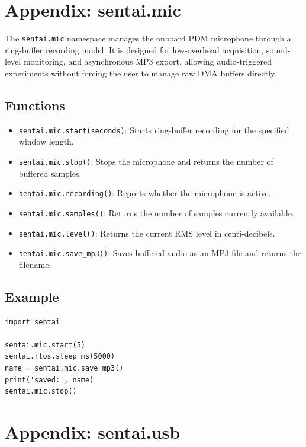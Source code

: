 \section{Appendix: sentai.mic}\label{appendix-sentai.mic}

The \texttt{sentai.mic} namespace manages the onboard PDM microphone
through a ring-buffer recording model. It is designed for low-overhead
acquisition, sound-level monitoring, and asynchronous MP3 export,
allowing audio-triggered experiments without forcing the user to manage
raw DMA buffers directly.

\subsection{Functions}\label{functions-7}

\begin{itemize}
\tightlist
\item
  \texttt{sentai.mic.start(seconds)}: Starts ring-buffer recording for
  the specified window length.
\item
  \texttt{sentai.mic.stop()}: Stops the microphone and returns the
  number of buffered samples.
\item
  \texttt{sentai.mic.recording()}: Reports whether the microphone is
  active.
\item
  \texttt{sentai.mic.samples()}: Returns the number of samples currently
  available.
\item
  \texttt{sentai.mic.level()}: Returns the current RMS level in
  centi-decibels.
\item
  \texttt{sentai.mic.save\_mp3()}: Saves buffered audio as an MP3 file
  and returns the filename.
\end{itemize}

\subsection{Example}\label{example-7}

\begin{verbatim}
import sentai

sentai.mic.start(5)
sentai.rtos.sleep_ms(5000)
name = sentai.mic.save_mp3()
print('saved:', name)
sentai.mic.stop()
\end{verbatim}

\section{Appendix: sentai.usb}\label{appendix-sentai.usb}

